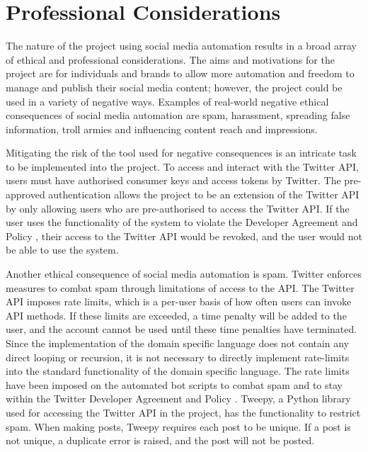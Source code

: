 \chapter{Professional Considerations}

The nature of the project using social media automation results in a broad array of ethical and professional considerations. The aims and motivations for the project are for individuals and brands to allow more automation and freedom to manage and publish their social media content; however, the project could be used in a variety of negative ways. Examples of real-world negative ethical consequences of social media automation are spam, harassment, spreading false information, troll armies and influencing content reach and impressions. \newline \par

Mitigating the risk of the tool used for negative consequences is an intricate task to be implemented into the project. To access and interact with the Twitter API, users must have authorised consumer keys and access tokens by Twitter. The pre-approved authentication allows the project to be an extension of the Twitter API by only allowing users who are pre-authorised to access the Twitter API. If the user uses the functionality of the system to violate the Developer Agreement and Policy \cite{DeveloperPolicy}, their access to the Twitter API would be revoked, and the user would not be able to use the system. \newline \par

Another ethical consequence of social media automation is spam. Twitter enforces measures to combat spam through limitations of access to the API. The Twitter API imposes rate limits, which is a per-user basis of how often users can invoke API methods. If these limits are exceeded, a time penalty will be added to the user, and the account cannot be used until these time penalties have terminated. Since the implementation of the domain specific language does not contain any direct looping or recursion, it is not necessary to directly implement rate-limits into the standard functionality of the domain specific language. The rate limits have been imposed on the automated bot scripts to combat spam and to stay within the Twitter Developer Agreement and Policy \cite{DeveloperPolicy}. Tweepy, a Python library used for accessing the Twitter API in the project, has the functionality to restrict spam. When making posts, Tweepy requires each post to be unique. If a post is not unique, a duplicate error is raised, and the post will not be posted.

